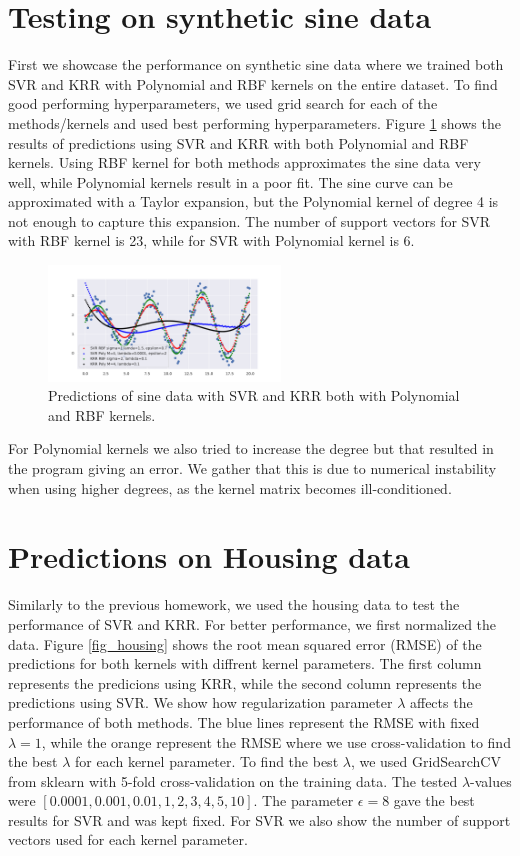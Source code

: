 \documentclass[9pt]{IEEEtran}
\begin{document}
\section{Testing on synthetic sine data}
First we showcase the performance on synthetic sine data where we trained both SVR and KRR with Polynomial and RBF kernels on the entire dataset.
To find good performing hyperparameters, we used grid search for each of the methods/kernels and used best performing hyperparameters.
Figure \ref{fig:sine} shows the results of predictions using SVR and KRR with both Polynomial and RBF kernels.
Using RBF kernel for both methods approximates the sine data very well, while Polynomial kernels result in a poor fit.
The sine curve can be approximated with a Taylor expansion, but the Polynomial kernel of degree 4 is not enough to capture this expansion.
The number of support vectors for SVR with RBF kernel is 23, while for SVR with Polynomial kernel is 6.
\begin{figure}[H]
    \centering
    \includegraphics[width=0.55\textwidth]{sine.pdf}
    \caption{Predictions of sine data with SVR and KRR both with Polynomial and RBF kernels.}
    \label{fig:sine}
\end{figure}
For Polynomial kernels we also tried to increase the degree but that resulted in the program giving an error.
We gather that this is due to numerical instability when using higher degrees, as the kernel matrix becomes ill-conditioned.

\section{Predictions on Housing data}
Similarly to the previous homework, we used the housing data to test the performance of SVR and KRR.
For better performance, we first normalized the data.
Figure \ref{fig_housing} shows the root mean squared error (RMSE) of the predictions for both kernels with diffrent kernel parameters.
The first column represents the predicions using KRR, while the second column represents the predictions using SVR.
We show how regularization parameter $\lambda$ affects the performance of both methods.
The blue lines represent the RMSE with fixed $\lambda=1$, while the orange represent the RMSE where we use cross-validation to find the best $\lambda$ for each kernel parameter.
To find the best $\lambda$, we used GridSearchCV from sklearn with 5-fold cross-validation on the training data.
The tested $\lambda$-values were $[0.0001, 0.001, 0.01, 1, 2, 3, 4, 5, 10]$.
The parameter $\epsilon=8$ gave the best results for SVR and was kept fixed.
For SVR we also show the number of support vectors used for each kernel parameter.
\end{document}
